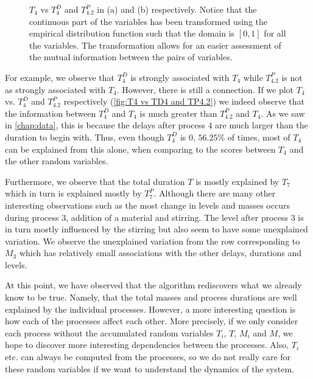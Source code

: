 \documentclass[../Thesis.tex]{subfiles}
\begin{document}
\begin{figure}[H]
\begin{subfigure}[t]{0.49\linewidth}
        \caption{}
    \end{subfigure}
    \caption{$T_4$ vs $T^D_4$ and $T^P_{4.2}$ in (a) and (b) respectively. Notice that the continuous part of the variables has been transformed using the empirical distribution function such that the domain is $[0,1]$ for all the variables. The transformation allows for an easier assessment of the mutual information between the pairs of variables.}
    \label{fig:T4 vs TD4 and TP4.2}
\end{figure}

For example, we observe that $T^D_4$ is strongly associated with $T_4$ while $T^P_{4.2}$ is not as strongly associated with $T_4$. However, there is still a connection. If we plot $T_4$ vs. $T^D_4$ and $T^P_{4.2}$ respectively (\autoref{fig:T4 vs TD4 and TP4.2}) we indeed observe that the information between $T^D_4$ and $T_4$ is much greater than $T^P_{4.2}$ and $T_4$. As we saw in \autoref{chap:data}, this is because the delays after process $4$ are much larger than the duration to begin with. Thus, even though $T^D_4$ is $0$, $56.25\%$ of times, most of $T_4$ can be explained from this alone, when comparing to the scores between $T_4$ and the other random variables.

Furthermore, we observe that the total duration $T$ is mostly explained by $T_7$ which in turn is explained mostly by $T^P_7$. Although there are many other interesting observations such as the most change in levels and masses occurs during process $3$, addition of a material and stirring. The level after process $3$ is in turn mostly influenced by the stirring but also seem to have some unexplained variation. We observe the unexplained variation from the row corresponding to $M_3$ which has relatively small associations with the other delays, durations and levels.

At this point, we have observed that the algorithm rediscovers what we already know to be true. Namely, that the total masses and process durations are well explained by the individual processes. However, a more interesting question is how each of the processes affect each other. More precisely, if we only consider each process without the accumulated random variables $T_i$, $T$, $M_i$ and $M$, we hope to discover more interesting dependencies between the processes. Also, $T_i$ etc. can always be computed from the processes, so we do not really care for these random variables if we want to understand the dynamics of the system.
\end{document}
